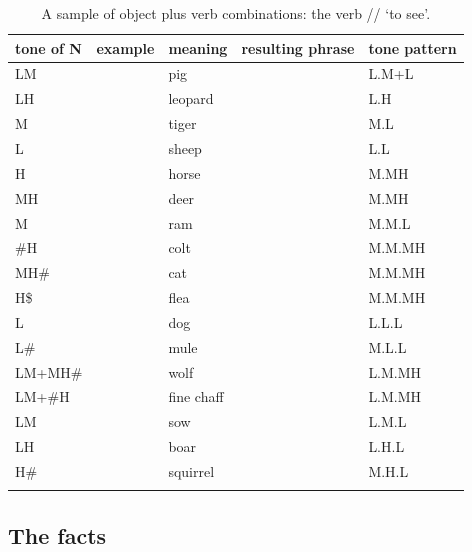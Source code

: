 \begin{table}%
	\caption{\label{tab:sampleofofoplusv}A sample of object plus verb combinations: the verb // ‘to see'.}
	\begin{tabularx}{\textwidth}{ l l l l@{\hspace{11mm}} Q }
		\lsptoprule
		tone of N & example & meaning & resulting phrase & tone pattern\\ \midrule
		LM &  & pig &   & L.M+L\\
		LH &  & leopard &  & L.H\\
		M &  & tiger &   & M.L\\
		L &  & sheep &   & L.L\\
		H &  & horse &    & M.MH\\
		MH &  & deer &    & M.MH\\ \addlinespace \hdashline \addlinespace
		M &  & ram &   & M.M.L\\
		\#H &  & colt &    & M.M.MH\\
		MH\# &  & cat &   & M.M.MH\\
		H\$ &  & flea &   & M.M.MH\\
		L &  & dog &   & L.L.L\\
		L\# &  & mule &  & M.L.L\\
		LM+MH\# &  & wolf &  & L.M.MH\\
		LM+\#H &  & fine chaff &   & L.M.MH\\
		LM &  & sow &   & L.M.L\\
		LH &  & boar &   & L.H.L\\
		H\# &  & squirrel &   & M.H.L\\
		\lspbottomrule
	\end{tabularx}
	\end{table}

\subsection{The facts}
\label{sec:thefactsobjectandnonprefixedverb}


